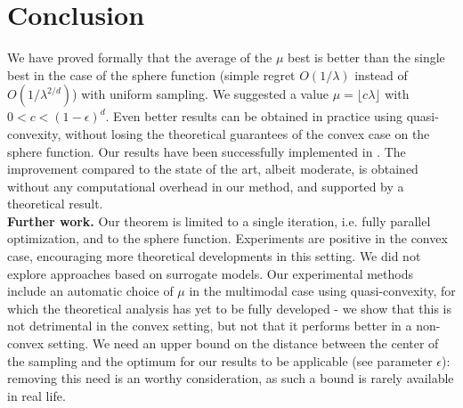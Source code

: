 \section{Conclusion}
We have proved formally that the average of the $\mu$ best is better than the single best in the case of the sphere function (simple regret $O(1/\lambda)$ instead of $O(1/\lambda^{2/d})$) with uniform sampling. We suggested a value $\mu=\lfloor c\lambda\rfloor$ with $0<c<(1-\epsilon)^{d}$. Even better results can be obtained in practice using quasi-convexity, without losing the theoretical guarantees of the convex case on the sphere function. Our results have been successfully implemented in \cite{nevergrad}. The improvement compared to the state of the art, albeit moderate, is obtained without any computational overhead in our method, and supported by a theoretical result.\\

{\bf{Further work.}} Our theorem is limited to a single iteration, i.e. fully parallel optimization, and to the sphere function. Experiments are positive in the convex case, encouraging more theoretical developments in this setting. We did not explore approaches based on surrogate models. Our experimental methods include an automatic choice of $\mu$ in the multimodal case using quasi-convexity, for which the theoretical analysis has yet to be fully developed - we show that this is not detrimental in the convex setting, but not that it performs better in a non-convex setting.
We need an upper bound on the distance between the center of the sampling and the optimum for our results to be applicable (see parameter $\epsilon$): removing this need is an worthy consideration, as such a bound is rarely available in real life. 

